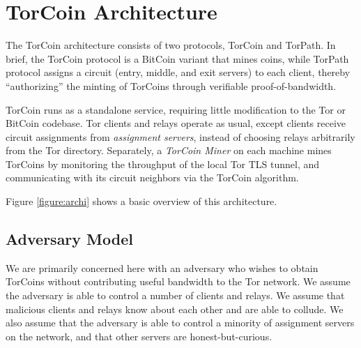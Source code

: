 \section{TorCoin Architecture} \label{arch}



The TorCoin architecture consists of two protocols, TorCoin and TorPath.
In brief, the TorCoin protocol is a BitCoin variant that mines coins,
while TorPath protocol assigns a circuit (entry, middle, and exit servers) to
each client, thereby ``authorizing'' the minting of TorCoins
through verifiable proof-of-bandwidth.

TorCoin runs as a standalone service, requiring little modification to the
Tor or BitCoin codebase. Tor clients and relays operate as usual,
except clients receive circuit
assignments from \textit{assignment servers},
instead of choosing relays arbitrarily from the Tor directory.
Separately, a \textit{TorCoin Miner} on each machine mines TorCoins by
monitoring the throughput of the local Tor TLS tunnel, and communicating with
its circuit neighbors via the TorCoin algorithm.

Figure \ref{figure:archi} shows a basic overview of this architecture.


\subsection{Adversary Model}
We are primarily concerned here with an adversary who
wishes to obtain TorCoins without contributing useful bandwidth
to the Tor network. We assume the adversary
is able to control a number of clients and relays. We assume that malicious
clients and relays know about each other and are able to collude.
We also assume that the adversary is able to control a minority of assignment
servers on the network, and that other servers are honest-but-curious.
